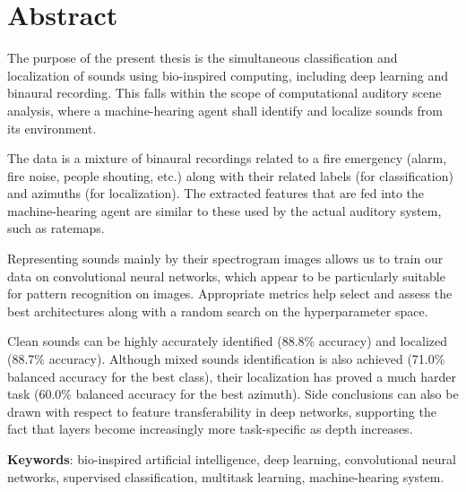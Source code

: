 \chapter*{Abstract}
\label{sec:abstract}


The purpose of the present thesis is the simultaneous classification and localization of sounds using bio-inspired computing, including deep learning and binaural recording. This falls within the scope of computational auditory scene analysis, where a machine-hearing agent shall identify and localize sounds from its environment.

The data is a mixture of binaural recordings related to a fire emergency (alarm, fire noise, people shouting, etc.) along with their related labels (for classification) and azimuths (for localization). The extracted features that are fed into the machine-hearing agent are similar to these used by the actual auditory system, such as ratemaps.

Representing sounds mainly by their spectrogram images allows us to train our data on convolutional neural networks, which appear to be particularly suitable for pattern recognition on images. Appropriate metrics help select and assess the best architectures along with a random search on the hyperparameter space.

Clean sounds can be highly accurately identified (88.8\% accuracy) and localized (88.7\% accuracy). Although mixed sounds identification is also achieved (71.0\% balanced accuracy for the best class), their localization has proved a much harder task (60.0\% balanced accuracy for the best azimuth). Side conclusions can also be drawn with respect to feature transferability in deep networks, supporting the fact that layers become increasingly more task-specific as depth increases.

\textbf{Keywords}: bio-inspired artificial intelligence, deep learning, convolutional neural networks, supervised classification, multitask learning, machine-hearing system.